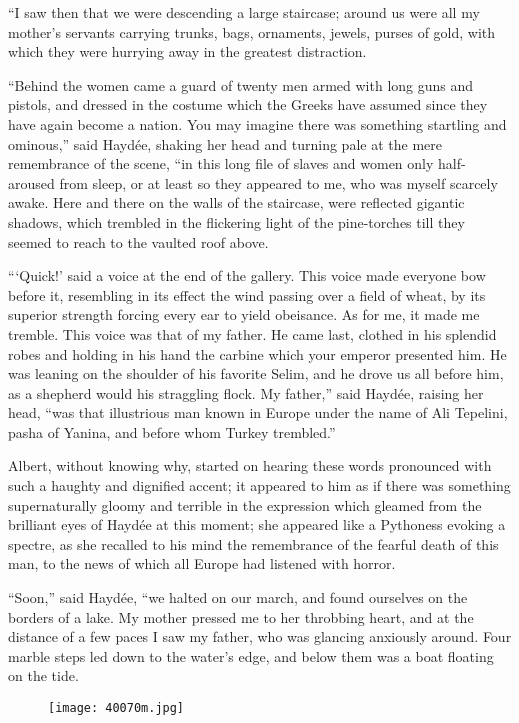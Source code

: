 “I saw then that we were descending a large staircase; around us were
all my mother’s servants carrying trunks, bags, ornaments, jewels,
purses of gold, with which they were hurrying away in the greatest
distraction.

“Behind the women came a guard of twenty men armed with long guns and
pistols, and dressed in the costume which the Greeks have assumed since
they have again become a nation. You may imagine there was something
startling and ominous,” said Haydée, shaking her head and turning pale
at the mere remembrance of the scene, “in this long file of slaves and
women only half-aroused from sleep, or at least so they appeared to me,
who was myself scarcely awake. Here and there on the walls of the
staircase, were reflected gigantic shadows, which trembled in the
flickering light of the pine-torches till they seemed to reach to the
vaulted roof above.

“‘Quick!’ said a voice at the end of the gallery. This voice made
everyone bow before it, resembling in its effect the wind passing over
a field of wheat, by its superior strength forcing every ear to yield
obeisance. As for me, it made me tremble. This voice was that of my
father. He came last, clothed in his splendid robes and holding in his
hand the carbine which your emperor presented him. He was leaning on
the shoulder of his favorite Selim, and he drove us all before him, as
a shepherd would his straggling flock. My father,” said Haydée, raising
her head, “was that illustrious man known in Europe under the name of
Ali Tepelini, pasha of Yanina, and before whom Turkey trembled.”

Albert, without knowing why, started on hearing these words pronounced
with such a haughty and dignified accent; it appeared to him as if
there was something supernaturally gloomy and terrible in the
expression which gleamed from the brilliant eyes of Haydée at this
moment; she appeared like a Pythoness evoking a spectre, as she
recalled to his mind the remembrance of the fearful death of this man,
to the news of which all Europe had listened with horror.

“Soon,” said Haydée, “we halted on our march, and found ourselves on
the borders of a lake. My mother pressed me to her throbbing heart, and
at the distance of a few paces I saw my father, who was glancing
anxiously around. Four marble steps led down to the water’s edge, and
below them was a boat floating on the tide.

\begin{figure}[ht]
\texttt{[image: 40070m.jpg]}
\end{figure}

